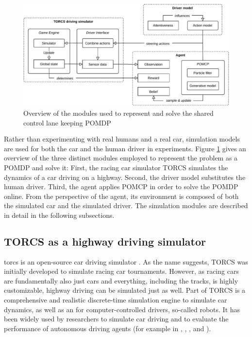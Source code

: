 \begin{figure}[htbp]
    \centerfloat
    \includegraphics[width=1.0\textwidth]{figures/Components.pdf}
    \caption{Overview of the modules used to represent and solve the shared control lane keeping POMDP}
    \label{fig:overview}
\end{figure}

Rather than experimenting with real humans and a real car, simulation models are used for both the car and the human driver in experiments. Figure \ref{fig:overview} gives an overview of the three distinct modules employed to represent the problem as a POMDP and solve it: First, the racing car simulator TORCS \parencite{torcs} simulates the dynamics of a car driving on a highway. Second, the driver model substitutes the human driver. Third, the agent applies POMCP in order to solve the POMDP online. From the perspective of the agent, its environment is composed of both the simulated car and the simulated driver. The simulation modules are described in detail in the following subsections. 

\subsection{TORCS as a highway driving simulator}
\label{torcs}

\acrfull{torcs} is an open-source car driving simulator \parencite{torcs}. As the name suggests, TORCS was initially developed to simulate racing car tournaments. However, as racing cars are fundamentally also just cars and everything, including the tracks, is highly customizable, highway driving can be simulated just as well. Part of TORCS is a comprehensive and realistic discrete-time simulation engine to simulate car dynamics, as well as an  for computer-controlled drivers, so-called robots. It has been widely used by researchers to simulate car driving and to evaluate the performance of autonomous driving agents (for example in \cite{torcs-3}, \cite{torcs-1}, \cite{torcs-2}, and \cite{reward1}).

